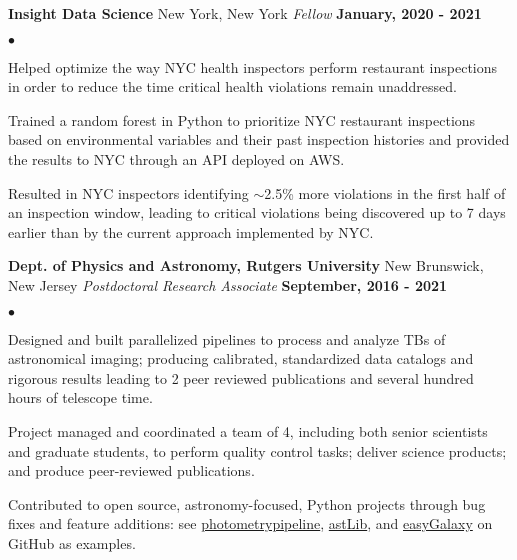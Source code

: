\documentclass[margin,line, 11pt]{res}
\newenvironment{list2}{
  \begin{list}{$\bullet$}{%
      \setlength{\itemsep}{0in}
      \setlength{\parsep}{0in} \setlength{\parskip}{0in}
      \setlength{\topsep}{0in} \setlength{\partopsep}{0in}
      \setlength{\leftmargin}{0.2in}}}{\end{list}}
\begin{document}
\begin{resume}
\textbf{Insight Data Science} \hfill New York, New York\newline
\textit{Fellow} \hfill \textbf{January, 2020 - 2021}\newline
    \begin{list2}
    	\vspace*{-5mm}
      \item Helped optimize the way NYC health inspectors perform restaurant inspections in order to reduce the time critical health violations remain unaddressed.
    	\item Trained a random forest in Python to prioritize NYC restaurant inspections based on environmental variables and their past inspection histories and provided the results to NYC through an API deployed on AWS.
    	\item Resulted in NYC inspectors identifying $\sim$2.5\% more violations in the first half of an inspection window,  leading to critical violations being discovered up to 7 days earlier than by the current approach implemented by NYC.
    \end{list2}
\vspace*{-2mm}

\textbf{Dept. of Physics and Astronomy, Rutgers University} \hfill New Brunswick, New Jersey\newline
\textit{Postdoctoral Research Associate} \hfill \textbf{September, 2016 - 2021}\newline
    \begin{list2}
    	\vspace*{-5mm}
    	\item Designed and built parallelized pipelines to process and analyze TBs of astronomical imaging; producing calibrated, standardized data catalogs and rigorous results leading to 2 peer reviewed publications and several hundred hours of telescope time.
    	\item Project managed and coordinated a team of 4, including both senior scientists and graduate students,
      to perform quality control tasks; deliver science products; and produce peer-reviewed publications.
    	\item Contributed to open source, astronomy-focused, Python projects through bug fixes and feature additions: see \href{https://github.com/boada/photometrypipeline}{photometrypipeline}, \href{http://astlib.sourceforge.net/}{astLib}, and \href{https://github.com/boada/easyGalaxy}{easyGalaxy} on GitHub as examples.
    \end{list2}
\vspace*{-2mm}


\end{resume}
\end{document}
